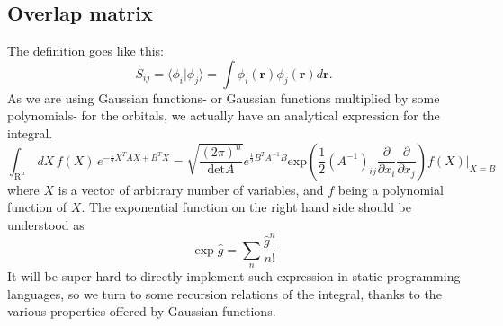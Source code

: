 \documentclass[12pt,a4paper,openany,twoside]{article}
\numberwithin{equation}{section}
\begin{document}
\subsection{Overlap matrix}
The definition goes like this:
\begin{equation}
    S_{ij} = \langle \phi_i | \phi_j \rangle = \int \phi_i(\boldsymbol{r}) \phi_j(\boldsymbol{r}) d \boldsymbol{r}.
\end{equation}
As we are using Gaussian functions- or Gaussian functions multiplied by some polynomials- for the orbitals, we actually have an analytical expression for the integral. 
\begin{equation}
    \int_\mathrm{R^n}\, dX \, f(X)\,e^{-\frac{1}{2}X^T A X + B^T X }= \sqrt{\frac{(2\pi)^n}{\mathrm{det} A}}e^{\frac{1}{2}B^T A^{-1}B} \mathrm{exp}\left(\frac{1}{2}(A^{-1})_{ij} \frac{\partial}{\partial x_i}\frac{\partial}{\partial x_j}\right) f(X) \bigg|_{X=B}
\end{equation}
where $X$ is a vector of arbitrary number of variables, and $f$ being a polynomial function of $X$. The exponential function on the right hand side should be understood as
\begin{equation}
    \exp{\hat{g}} = \sum_n \frac{\hat{g}^n}{n!}
\end{equation}
It will be super hard to directly implement such expression in static programming languages, so we turn to some recursion relations of the integral, thanks to the various properties offered by Gaussian functions.
\end{document}
